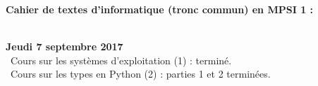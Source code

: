 \documentclass[12pt,a4paper]{article}
\begin{document}
\begin{center}
\Large\bf Cahier de textes d'informatique (tronc commun) en MPSI 1 :
\end{center}
\vspace{1cm}
\vspace{.4cm}\\

\noindent\textbf{Jeudi 7 septembre 2017}\\
\bu\ Cours sur les systèmes d'exploitation (1) : terminé.  \\
\bu\ Cours sur les types en Python (2) : parties 1 et 2 terminées. \\
\vspace{.4cm}

\label{end}
\end{document}
